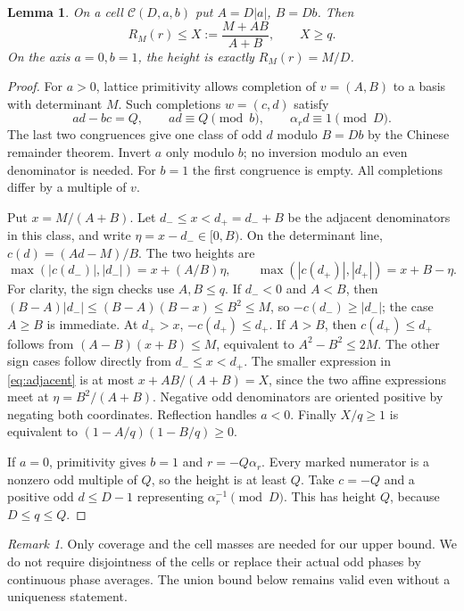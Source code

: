 \documentclass[11pt,a4paper]{article}
\numberwithin{equation}{section}
\newtheorem{lemma}[theorem]{Lemma}
\theoremstyle{remark}
\newtheorem{remark}[theorem]{Remark}
\begin{document}
\begin{lemma}\label{lem:completion}
On a cell $\mathcal C(D,a,b)$ put $A=D|a|$, $B=Db$. Then
\begin{equation}\label{eq:X}
 R_M(r)\le X:=\frac{M+AB}{A+B},\qquad X\ge q.
\end{equation}
On the axis $a=0,b=1$, the height is exactly $R_M(r)=M/D$.
\end{lemma}
\begin{proof}
For $a>0$, lattice primitivity allows completion of $v=(A,B)$ to a
basis with determinant $M$. Such completions $w=(c,d)$ satisfy
\[
 ad-bc=Q,\qquad ad\equiv Q\pmod b,\qquad
                       \alpha_r d\equiv1\pmod D.
\]
The last two congruences give one class of odd $d$ modulo $B=Db$ by
the Chinese remainder theorem. Invert $a$ only modulo $b$; no inversion
modulo an even denominator is needed. For $b=1$ the first congruence
is empty. All completions differ by a multiple of $v$.

Put $x=M/(A+B)$. Let $d_-\le x<d_+=d_-+B$ be the adjacent denominators
in this class, and write $\eta=x-d_-\in[0,B)$.
On the determinant line, $c(d)=(Ad-M)/B$. The two heights are
\begin{equation}\label{eq:adjacent}
 \max(|c(d_-)|,|d_-|)=x+(A/B)\eta,\qquad
 \max(|c(d_+)|,|d_+|)=x+B-\eta.
\end{equation}
For clarity, the sign checks use $A,B\le q$.
If $d_-<0$ and $A<B$, then
$(B-A)|d_-|\le(B-A)(B-x)\le B^2\le M$, so $-c(d_-)\ge|d_-|$;
the case $A\ge B$ is immediate.
At $d_+>x$, $-c(d_+)\le d_+$.
If $A>B$, then $c(d_+)\le d_+$ follows from
$(A-B)(x+B)\le M$, equivalent to $A^2-B^2\le2M$.
The other sign cases follow directly from $d_-\le x<d_+$.
The smaller expression in \eqref{eq:adjacent} is at most
$x+AB/(A+B)=X$, since the two affine expressions meet at
$\eta=B^2/(A+B)$.
Negative odd denominators are oriented positive by negating both
coordinates. Reflection handles $a<0$.
Finally $X/q\ge1$ is equivalent to
$(1-A/q)(1-B/q)\ge0$.

If $a=0$, primitivity gives $b=1$ and $r=-Q\alpha_r$.
Every marked numerator is a nonzero odd multiple of $Q$, so the height
is at least $Q$.
Take $c=-Q$ and a positive odd $d\le D-1$ representing
$\alpha_r^{-1}\pmod D$. This has height $Q$, because $D\le q\le Q$.
\end{proof}

\begin{remark}
Only coverage and the cell masses are needed for our upper bound.
We do not require disjointness of the cells or replace their actual
odd phases by continuous phase averages. The union bound below remains
valid even without a uniqueness statement.
\end{remark}
\end{document}
